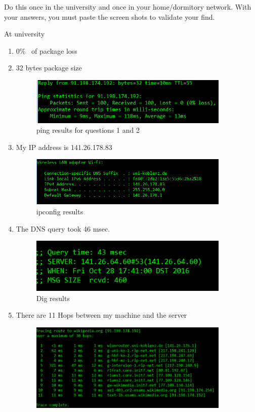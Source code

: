 \documentclass{WeSTassignment}
\begin{document}
Do this once in the university and once in your home/dormitory network. With your answers, you must paste the screen shots to validate your find.

At university 
\begin{enumerate}
\itemsep0em
\item  0\% \ of package loss\
\item 32 bytes package size
\begin{figure}[h]
  \centering
  \includegraphics[width=0.9\textwidth]{ping.png}
   \caption{ping results for questions 1 and 2}
     \label{fig:ping}
\end{figure}
\item My IP address is 141.26.178.83 \\
\begin{figure}[!ht]
  \centering
  \includegraphics[width=0.9\textwidth]{my_ip.png}
   \caption{ipconfig results}
     \label{fig:ipconfig}
\end{figure}
\item The DNS query took 46 msec.
\begin{figure}[h]
  \centering
  \includegraphics[width=0.9\textwidth]{dig.png}
   \caption{Dig results}
     \label{fig:dig}
\end{figure}
\item There are 11 Hops between my machine and the server
\begin{figure}[h]
  \centering
  \includegraphics[width=0.9\textwidth]{tracert.png}

\end{figure}
\end{enumerate}
\end{document}
